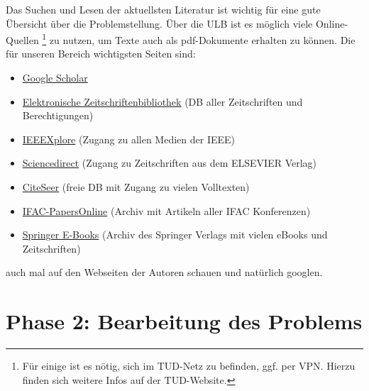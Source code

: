 Das Suchen und Lesen der aktuellsten Literatur ist wichtig für eine gute Übersicht über die Problemstellung.
Über die ULB ist es möglich viele Online-Quellen%
\footnote{Für einige ist es nötig, sich im TUD-Netz zu befinden, ggf. per VPN.
Hierzu finden sich weitere Infos auf der TUD-Website.}
zu nutzen, um Texte auch als pdf-Dokumente erhalten zu können.
Die für unseren Bereich wichtigsten Seiten sind:
\begin{itemize}
  \item \href{https://scholar.google.de/}{Google Scholar}
  \item \href{http://rzblx1.uni-regensburg.de/ezeit/}{Elektronische Zeitschriftenbibliothek} (DB aller Zeitschriften und Berechtigungen)
  \item \href{http://ieeexplore.ieee.org}{IEEEXplore} (Zugang zu allen Medien der IEEE)
  \item \href{http://www.sciencedirect.com}{Sciencedirect} (Zugang zu Zeitschriften aus dem ELSEVIER Verlag)
  \item \href{http://citeseerx.ist.psu.edu}{CiteSeer} (freie DB mit Zugang zu vielen Volltexten)
  \item \href{http://www.ifac-control.org/publications/ifac-papersonline.net}{IFAC-PapersOnline} (Archiv mit Artikeln aller IFAC Konferenzen)
  \item \href{http://link.springer.com/}{Springer E-Books} (Archiv des Springer Verlags mit vielen eBooks und Zeitschriften)
\end{itemize}
auch mal auf den Webseiten der Autoren schauen und natürlich \glqq{}googlen\grqq{}.


\section{Phase 2: Bearbeitung des Problems}
\label{sec:Bearbeitung}

